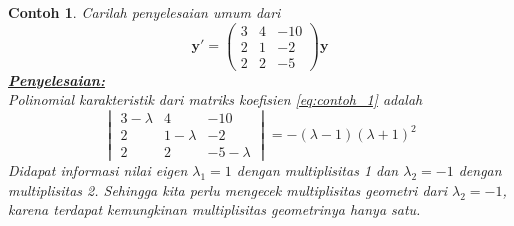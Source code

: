 \documentclass[a4paper]{article}
\theoremstyle{definisi}
\newtheorem{contoh}{Contoh}[section]
\newcommand{\penyelesaian}{\textbf{\underline{Penyelesaian:}}\\}
\numberwithin{equation}{section}
\begin{document}
  \begin{contoh}
    Carilah penyelesaian umum dari
    \begin{equation}\label{eq:contoh_1}
      \mathbf{y'}=\begin{pmatrix}
        3&4&-10\\
        2&1&-2\\
        2&2&-5
      \end{pmatrix}\mathbf{y}
    \end{equation}
    \penyelesaian
    Polinomial karakteristik dari matriks koefisien \eqref{eq:contoh_1} adalah
    \begin{equation*}
      \begin{vmatrix}
        3-\lambda&4&-10\\
        2&1-\lambda&-2\\
        2&2&-5-\lambda
      \end{vmatrix}=-(\lambda-1)(\lambda+1)^2
    \end{equation*}
    Didapat informasi nilai eigen $\lambda_1=1$ dengan multiplisitas 1 dan $\lambda_2=-1$ dengan multiplisitas 2. Sehingga kita perlu mengecek multiplisitas geometri dari $\lambda_2=-1$, karena terdapat kemungkinan multiplisitas geometrinya hanya satu.


\end{contoh}
\end{document}
